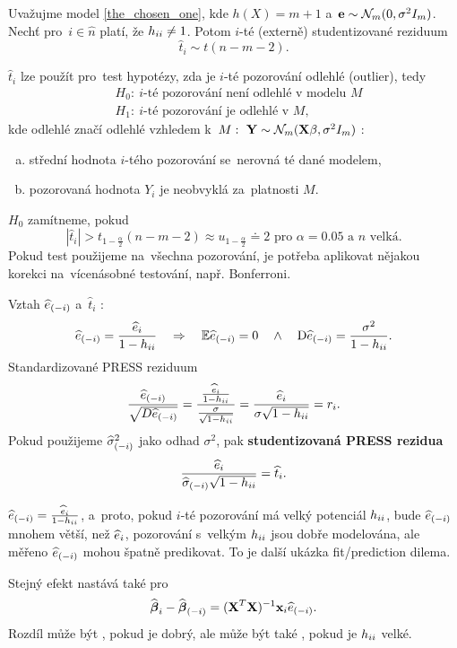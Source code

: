 \begin{corollary}
	Uvažujme model \eqref{the_chosen_one}, kde $h(X) = m+1$ a~$\mathbf{e}\sim\mathcal{N}_m(0,\sigma^2 I_m)$. Nechť pro~$i\in\widehat{n}$ platí, že $h_{ii}\neq1$. Potom $i$-té (externě) studentizované reziduum
	 $$ \widehat{t}_i\sim t(n-m-2). $$
\end{corollary}
\begin{remark}
	 $\widehat{t}_i$ lze použít pro~test hypotézy, zda je $i$-té pozorování odlehlé (outlier), tedy
	\[
	\begin{split}
	&H_0:~i\text{-té pozorování není odlehlé v~modelu }M\\
	&H_1:~i\text{-té pozorování je odlehlé v~}M,
	\end{split}
	\] kde odlehlé značí odlehlé vzhledem k~$M:~\mathbf{Y}\sim\mathcal{N}_m(\textbf{X}\beta,\sigma^2 I_m)$ :\begin{enumerate}[a)]
		\item střední hodnota $i$-tého pozorování se~nerovná té dané modelem,
		\item pozorovaná hodnota $Y_i$ je neobvyklá za~platnosti $M$.
	\end{enumerate}
 $H_0$ zamítneme, pokud $$ |\widehat{t}_i|>t_{1-\frac{\alpha}{2}}(n-m-2)\approx u_{1-\frac{\alpha}{2}} \doteq 2\text{ pro~}\alpha = 0.05\text{ a~}n\text{ velká}. $$
Pokud test použijeme na~všechna pozorování, je potřeba aplikovat nějakou korekci na~vícenásobné testování, např. Bonferroni.
\end{remark}
\begin{remark}
	Vztah $\widehat{e}_{(-i)}$ a~$\widehat{t}_i$ :
	 $$ \widehat{e}_{(-i)} = \frac{\widehat{e}_i}{1-h_{ii}}\quad\Rightarrow\quad\mathbb{E}\widehat{e}_{(-i)} = 0\quad\wedge\quad \mathrm{D} \widehat{e}_{(-i)} = \frac{\sigma^2}{1-h_{ii}}. $$
	Standardizované PRESS reziduum $$ \frac{\widehat{e}_{(-i)}}{\sqrt{D\widehat{e}_{(-i)}}} = \frac{\frac{\widehat{e}_i}{1-h_{ii}}}{\frac{\sigma}{\sqrt{1-h_{ii}}}} = \frac{\widehat{e}_i}{\sigma\sqrt{1-h_{ii}}} = r_i. $$
	Pokud použijeme $\widehat{\sigma}^2_{(-i)}$ jako odhad $\sigma^2$, pak \textbf{studentizovaná PRESS rezidua} $$ \frac{\widehat{e}_i}{\widehat{{\sigma}}_{(-i)}\sqrt{1-h_{ii}}} = \widehat{t}_i. $$
\end{remark}
\begin{remark}
	 $\widehat{e}_{(-i)} = \frac{\widehat{e}_i}{1-h_{ii}}$, a~proto, pokud $i$-té pozorování má velký potenciál $h_{ii}$, bude $\widehat{e}_{(-i)}$ mnohem větší, než $\widehat{e}_i$, pozorování s~velkým $h_{ii}$ jsou dobře modelována, ale měřeno $\widehat{e}_{(-i)}$ mohou špatně predikovat. To je další ukázka fit/prediction dilema.
	
	Stejný efekt nastává také pro~
	 $$ \widehat{\boldsymbol{\beta}}_i-\widehat{\boldsymbol{\beta}}_{(-i)} = {(\textbf{X}^T\textbf{X})^{-1}}\mathbf{x}_i\widehat{e}_{(-i)}. $$
	Rozdíl může být , pokud je  dobrý, ale může být také , pokud je $h_{ii}$ velké.
\end{remark}

